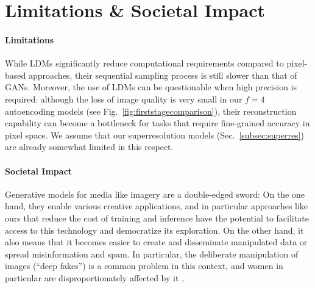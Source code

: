 \documentclass[10pt,twocolumn,letterpaper]{article}
\begin{document}
%
\inpaintingtable
%


%
%
%
%
%
%
%
%
%
%
%
%
%
%
%
%
%
%
%
%
%
%
%
%
%
%
%
%
%
%
%
%
%
%
%
%
%
%



%
%
%
%
%
%
%
%
%
%
%
%
%
%
%
%
%
%
%
%
%

%
%
%
%
%
%
%
%
%
%
%
%
%
%
%
%
%
%
%
%
%
%
%
%
%
%
%
%
%
%
%
%
%
%
%
%

%

%
%
%
%
%
%
%
%
%
%
%
%
%
%
%
%
%
%
%
%
%
%
%
%
%
%
%
%
%
%
%
%

%
%
%
%
%

\vspace{-0.5em}
\section{Limitations \& Societal Impact}
\label{sec:limitations}
\enlargethispage{\baselineskip}
%
\paragraph{Limitations}
While LDMs significantly reduce computational requirements compared to pixel-based approaches, 
%
their sequential sampling process is still slower than that of GANs.
Moreover, the use of LDMs can be questionable when high precision is required: 
although the loss of image quality is very small in our $f=4$ autoencoding models (see Fig.~\ref{fig:firststagecomparison}), 
their reconstruction capability can become a bottleneck for tasks that require fine-grained accuracy in pixel space. 
We assume that our superresolution models (Sec.~\ref{subsec:superres}) are already somewhat limited in this respect.

\vspace{-1.0em}
\paragraph{Societal Impact}
Generative models for media like imagery are a double-edged sword: On the one hand, they enable various creative applications, 
and in particular approaches like ours that reduce the cost of training and inference have the potential 
to facilitate access to this technology and democratize its exploration. 
On the other hand, it also means that it becomes easier to create and disseminate manipulated data or spread misinformation and spam. 
In particular, the deliberate manipulation of images (``deep fakes'') is a common problem in this context, 
and women in particular are disproportionately affected by it \cite{denton2021workshop, franks2018sex}.
\end{document}
